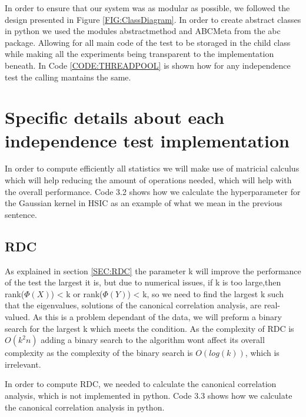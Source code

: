 In order to ensure that our system was as modular as possible, we followed the design presented in Figure \ref{FIG:ClassDiagram}. In order to create abstract classes in python we used the modules abstractmethod and ABCMeta from the abc package. Allowing for all main code of the test to be storaged in the child class while making all the experiments being transparent to the implementation beneath. In Code  \ref{CODE:THREADPOOL} is shown how for any independence test the calling mantains the same.

\section{Specific details about each independence test implementation}

In order to compute efficiently all statistics we will make use of matricial calculus which will help reducing the amount of operations needed, which will help with the overall performance. Code 3.2 shows how we calculate the hyperparameter for the Gaussian kernel in HSIC as an example of what we mean in the previous sentence.

\label{CODE:MEDIAN}

\subsection{RDC}

As explained in section \ref{SEC:RDC} the parameter k will improve the performance of the test the largest it is, but due to numerical issues, if k is too large,then rank($\Phi(X)$) < k or rank($\Phi(Y)$) < k, so we need to find the largest k such that the eigenvalues, solutions of the canonical correlation analysis,  are real-valued. As this is a problem dependant of the data, we will preform a binary search for the largest k which meets the condition. As the complexity of RDC is $O(k^{2}n)$ adding a binary search to the algorithm wont affect its overall complexity as the complexity of the binary search is $O(log(k))$, which is irrelevant.

In order to compute RDC, we needed to calculate the canonical correlation analysis, which is not implemented in python. Code 3.3 shows how we calculate the canonical correlation analysis in python.

\label{CODE:CANCOR}




